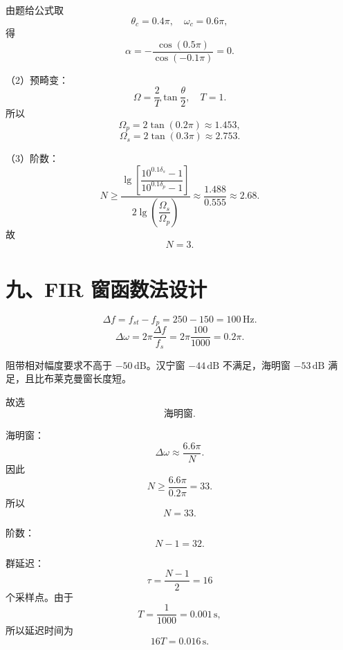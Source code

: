\documentclass[UTF8,a4paper,12pt]{ctexart}
\begin{document}
由题给公式取
\[
\theta_c=0.4\pi,\quad \omega_c=0.6\pi,
\]
得
\[
\alpha
=
-\frac{\cos(0.5\pi)}{\cos(-0.1\pi)}
=0.
\]

（2）预畸变：
\[
\Omega=\frac{2}{T}\tan\frac{\theta}{2},\quad T=1.
\]
所以
\[
\Omega_p=2\tan(0.2\pi)\approx 1.453,
\]
\[
\Omega_s=2\tan(0.3\pi)\approx 2.753.
\]

（3）阶数：
\[
N\geq
\frac{
\lg\left[
\dfrac{10^{0.1\delta_s}-1}{10^{0.1\delta_p}-1}
\right]
}{
2\lg\left(\dfrac{\Omega_s}{\Omega_p}\right)
}
\approx
\frac{1.488}{0.555}
\approx 2.68.
\]
故
\[
\boxed{N=3}.
\]

\section*{九、FIR 窗函数法设计}

\[
\Delta f=f_{st}-f_p=250-150=100\,\mathrm{Hz}.
\]
\[
\Delta\omega=
2\pi\frac{\Delta f}{f_s}
=
2\pi\frac{100}{1000}
=
0.2\pi.
\]

阻带相对幅度要求不高于 $-50\,\mathrm{dB}$。汉宁窗 $-44\,\mathrm{dB}$ 不满足，海明窗 $-53\,\mathrm{dB}$ 满足，且比布莱克曼窗长度短。

故选
\[
\boxed{\text{海明窗}}.
\]

海明窗：
\[
\Delta\omega\approx \frac{6.6\pi}{N}.
\]
因此
\[
N\geq \frac{6.6\pi}{0.2\pi}=33.
\]
所以
\[
\boxed{N=33}.
\]

阶数：
\[
\boxed{N-1=32}.
\]

群延迟：
\[
\tau=\frac{N-1}{2}=16
\]
个采样点。由于
\[
T=\frac{1}{1000}=0.001\,\mathrm{s},
\]
所以延迟时间为
\[
\boxed{16T=0.016\,\mathrm{s}}.
\]

\endgroup
\end{document}
